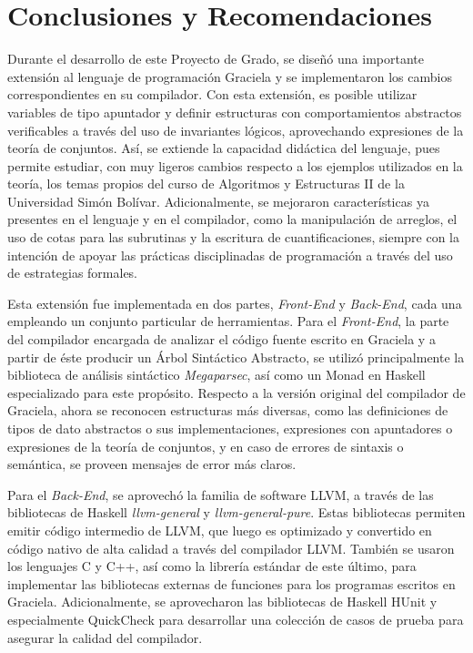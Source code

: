 \chapter*{Conclusiones y Recomendaciones}
\label{conclusiones}

Durante el desarrollo de este Proyecto de Grado, se diseñó una importante
extensión al lenguaje de programación Graciela y se implementaron los cambios
correspondientes en su compilador. Con esta extensión, es posible utilizar
variables de tipo apuntador y definir estructuras con comportamientos abstractos
verificables a través del uso de invariantes lógicos, aprovechando expresiones
de la teoría de conjuntos. Así, se extiende la capacidad didáctica del lenguaje,
pues permite estudiar, con muy ligeros cambios respecto a los ejemplos
utilizados en la teoría, los temas propios del curso de Algoritmos y Estructuras
II de la Universidad Simón Bolívar. Adicionalmente, se mejoraron características
ya presentes en el lenguaje y en el compilador, como la manipulación de
arreglos, el uso de cotas para las subrutinas y la escritura de
cuantificaciones, siempre con la intención de apoyar las prácticas disciplinadas
de programación a través del uso de estrategias formales.

Esta extensión fue implementada en dos partes, \textit{Front-End} y
\textit{Back-End}, cada una empleando un conjunto particular de herramientas.
Para el \textit{Front-End}, la parte del compilador encargada de analizar el
código fuente escrito en Graciela y a partir de éste producir un Árbol
Sintáctico Abstracto, se utilizó principalmente la biblioteca de análisis
sintáctico \textit{Megaparsec}, así como un Monad en Haskell especializado para
este propósito. Respecto a la versión original del compilador de Graciela, ahora
se reconocen estructuras más diversas, como las definiciones de tipos de dato
abstractos o sus implementaciones, expresiones con apuntadores o expresiones de
la teoría de conjuntos, y en caso de errores de sintaxis o semántica, se proveen
mensajes de error más claros.

Para el \textit{Back-End}, se aprovechó la familia de software LLVM, a través de
las bibliotecas de Haskell \textit{llvm-general} y \textit{llvm-general-pure}.
Estas bibliotecas permiten emitir código intermedio de LLVM, que luego es
optimizado y convertido en código nativo de alta calidad a través del compilador
LLVM. También se usaron los lenguajes C y C++, así como la librería
estándar de este último, para implementar las bibliotecas externas de funciones
para los programas escritos en Graciela. Adicionalmente, se aprovecharon las bibliotecas de Haskell HUnit y especialmente QuickCheck para desarrollar una colección de casos de prueba para
asegurar la calidad del compilador.

